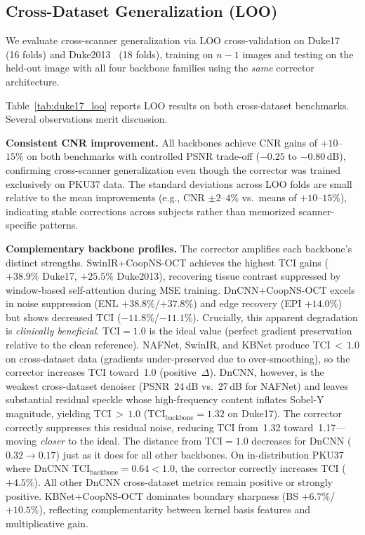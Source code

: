 \documentclass[journal,twoside,web]{ieeecolor}
\begin{document}
\subsection{Cross-Dataset Generalization (LOO)}
\label{sec:results_ood}

We evaluate cross-scanner generalization via LOO cross-validation on Duke17~\cite{fang2012sparsity} (16 folds) and Duke2013~\cite{fang2013fast} (18 folds), training on $n{-}1$ images and testing on the held-out image with all four backbone families using the \emph{same} corrector architecture.

Table~\ref{tab:duke17_loo} reports LOO results on both cross-dataset benchmarks. Several observations merit discussion.

\textbf{Consistent CNR improvement.} All backbones achieve CNR gains of $+10$--$15\%$ on both benchmarks with controlled PSNR trade-off ($-0.25$ to $-0.80$\,dB), confirming cross-scanner generalization even though the corrector was trained exclusively on PKU37 data. The standard deviations across LOO folds are small relative to the mean improvements (e.g., CNR $\pm 2$--$4\%$ vs.\ means of $+10$--$15\%$), indicating stable corrections across subjects rather than memorized scanner-specific patterns.

\textbf{Complementary backbone profiles.} The corrector amplifies each backbone's distinct strengths. SwinIR+CoopNS-OCT achieves the highest TCI gains ($+38.9\%$ Duke17, $+25.5\%$ Duke2013), recovering tissue contrast suppressed by window-based self-attention during MSE training. DnCNN+CoopNS-OCT excels in noise suppression (ENL $+38.8\%$/$+37.8\%$) and edge recovery (EPI $+14.0\%$) but shows decreased TCI ($-11.8\%$/$-11.1\%$). Crucially, this apparent degradation is \emph{clinically beneficial}. TCI${}=1.0$ is the ideal value (perfect gradient preservation relative to the clean reference). NAFNet, SwinIR, and KBNet produce TCI$\,{<}\,1.0$ on cross-dataset data (gradients under-preserved due to over-smoothing), so the corrector increases TCI toward~1.0 (positive~$\Delta$). DnCNN, however, is the weakest cross-dataset denoiser (PSNR~24\,dB vs.\ 27\,dB for NAFNet) and leaves substantial residual speckle whose high-frequency content inflates Sobel-Y magnitude, yielding TCI$\,{>}\,1.0$ ($\text{TCI}_\text{backbone} = 1.32$ on Duke17). The corrector correctly suppresses this residual noise, reducing TCI from~1.32 toward~1.17---moving \emph{closer} to the ideal. The distance from TCI${}=1.0$ decreases for DnCNN ($0.32 \to 0.17$) just as it does for all other backbones. On in-distribution PKU37 where DnCNN TCI$_\text{backbone} = 0.64 < 1.0$, the corrector correctly increases TCI ($+4.5\%$). All other DnCNN cross-dataset metrics remain positive or strongly positive. KBNet+CoopNS-OCT dominates boundary sharpness (BS $+6.7\%$/$+10.5\%$), reflecting complementarity between kernel basis features and multiplicative gain.
\end{document}
